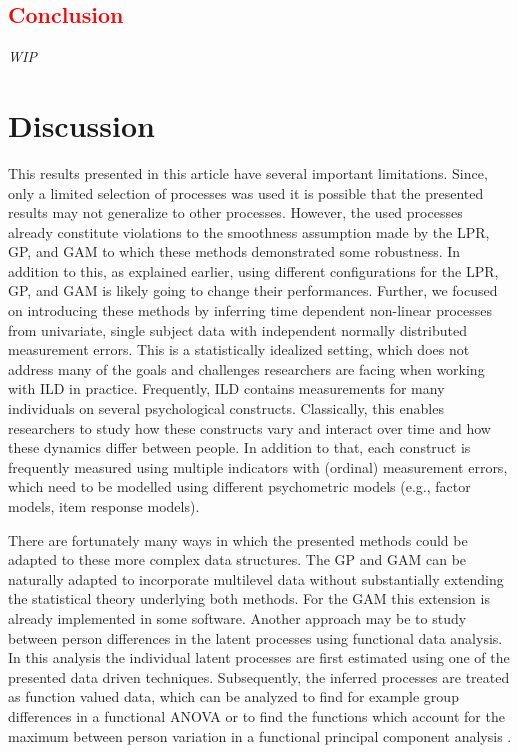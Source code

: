 \documentclass[man, floatsintext]{apa7}
\begin{document}
\subsection{\textcolor{red}{Conclusion}}

\textit{WIP}

\section{Discussion}

This results presented in this article have several important limitations.
Since, only a limited selection of processes was used it is possible that the
presented results may not generalize to other processes. However, the used
processes already constitute violations to the smoothness assumption made by
the LPR, GP, and GAM to which these methods demonstrated some robustness. In
addition to this, as explained earlier, using different configurations for the
LPR, GP, and GAM is likely going to change their performances. Further, we
focused on introducing these methods by inferring time dependent non-linear
processes from univariate, single subject data with independent normally
distributed measurement errors. This is a statistically idealized setting,
which does not address many of the goals and challenges researchers are facing
when working with ILD in practice. Frequently, ILD contains measurements for
many individuals on several psychological constructs. Classically, this enables
researchers to study how these constructs vary and interact over time and how
these dynamics differ between people. In addition to that, each construct is
frequently measured using multiple indicators with (ordinal) measurement
errors, which need to be modelled using different psychometric models (e.g.,
factor models, item response models).

There are fortunately many ways in which the presented methods could be adapted
to these more complex data structures. The GP and GAM can be naturally adapted
to incorporate multilevel data without substantially extending the statistical
theory underlying both methods. For the GAM this extension is already
implemented in some software. Another approach may be to study between person
differences in the latent processes using functional data analysis. In this
analysis the individual latent processes are first estimated using one of the
presented data driven techniques. Subsequently, the inferred processes are
treated as function valued data, which can be analyzed to find for example
group differences in a functional ANOVA \parencite{kaufman_bayesian_2010} or to
find the functions which account for the maximum between person variation in a
functional principal component analysis \parencite{aue_prediction_2015}.
\end{document}
